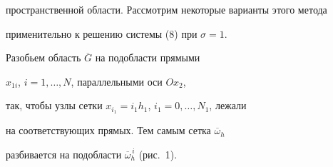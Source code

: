 пространственной области. Рассмотрим некоторые варианты этого метода


применительно к решению системы (8) при $\sigma=1$.





Разобьем область $\overline G$ на подобласти прямыми


$x_{1i}$, $i=1,\ldots,N$, параллельными оси $Ox_2$,


так, чтобы узлы сетки $x_{i_1}=i_1h_1$, $i_1=0,\ldots,N_1$, лежали


на соответствующих прямых. Тем самым сетка ${\overline\omega}_h$


разбивается на подобласти ${\overline\omega}_h^{\,i}$ (рис.~1).





\unitlength=1.00mm




\linethickness{0.4pt}


